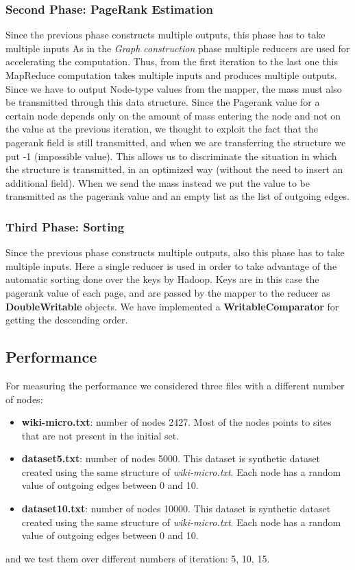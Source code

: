 \subsubsection{Second Phase: PageRank Estimation}
Since the previous phase constructs multiple outputs, this phase has to take multiple inputs
As in the \textit{Graph construction} phase multiple reducers are used for accelerating the computation. Thus, from the first iteration to the last one this MapReduce computation takes multiple inputs and produces multiple outputs.
\newline Since we have to output Node-type values from the mapper, the mass must also be transmitted through this data structure. Since the Pagerank value for a certain node depends only on the amount of mass entering the node and not on the value at the previous iteration, we thought to exploit the fact that the pagerank field is still transmitted, and when we are transferring the structure we put -1 (impossible value). This allows us to discriminate the situation in which the structure is transmitted, in an optimized way (without the need to insert an additional field). When we send the mass instead we put the value to be transmitted as the pagerank value and an empty list as the list of outgoing edges.

\subsubsection{Third Phase: Sorting}
Since the previous phase constructs multiple outputs, also this phase has to take multiple inputs. Here a single reducer is used in order to take advantage of the automatic sorting done over the keys by Hadoop. Keys are in this case the pagerank value of each page, and are passed by the mapper to the reducer as \textbf{DoubleWritable} objects. We have implemented a \textbf{WritableComparator} for getting the descending order.

\subsection{Performance}
For measuring the performance we considered three files with a different number of nodes:
\begin{itemize}
	\item \textbf{wiki-micro.txt}: number of nodes 2427. Most of the nodes points to sites that are not present in the initial set.
	\item \textbf{dataset5.txt}: number of nodes 5000. This dataset is synthetic dataset created using the same structure of \textit{wiki-micro.txt}. Each node has a random value of outgoing edges between 0 and 10.
	\item \textbf{dataset10.txt}: number of nodes 10000. This dataset is synthetic dataset created using the same structure of \textit{wiki-micro.txt}. Each node has a random value of outgoing edges between 0 and 10.
\end{itemize}
and we test them over different numbers of iteration: 5, 10, 15.

